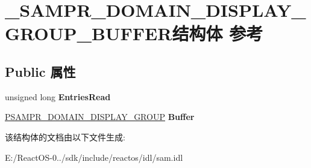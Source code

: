 \hypertarget{struct___s_a_m_p_r___d_o_m_a_i_n___d_i_s_p_l_a_y___g_r_o_u_p___b_u_f_f_e_r}{}\section{\+\_\+\+S\+A\+M\+P\+R\+\_\+\+D\+O\+M\+A\+I\+N\+\_\+\+D\+I\+S\+P\+L\+A\+Y\+\_\+\+G\+R\+O\+U\+P\+\_\+\+B\+U\+F\+F\+E\+R结构体 参考}
\label{struct___s_a_m_p_r___d_o_m_a_i_n___d_i_s_p_l_a_y___g_r_o_u_p___b_u_f_f_e_r}
\subsection*{Public 属性}
\begin{DoxyCompactItemize}
\item 
\mbox{\label{struct___s_a_m_p_r___d_o_m_a_i_n___d_i_s_p_l_a_y___g_r_o_u_p___b_u_f_f_e_r_ac9c7b6a177cea15b528778e5ed09d07c}} 
unsigned long {\bfseries Entries\+Read}
\item 
\mbox{\label{struct___s_a_m_p_r___d_o_m_a_i_n___d_i_s_p_l_a_y___g_r_o_u_p___b_u_f_f_e_r_aa430ea1b9e31aeded0323e91ef004290}} 
\hyperlink{struct___s_a_m_p_r___d_o_m_a_i_n___d_i_s_p_l_a_y___g_r_o_u_p}{P\+S\+A\+M\+P\+R\+\_\+\+D\+O\+M\+A\+I\+N\+\_\+\+D\+I\+S\+P\+L\+A\+Y\+\_\+\+G\+R\+O\+UP} {\bfseries Buffer}
\end{DoxyCompactItemize}


该结构体的文档由以下文件生成\+:\begin{DoxyCompactItemize}
\item 
E\+:/\+React\+O\+S-\/0../sdk/include/reactos/idl/sam.\+idl\end{DoxyCompactItemize}
